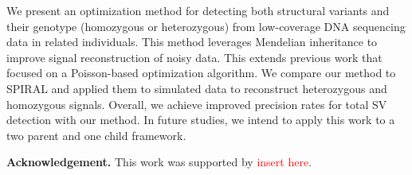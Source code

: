 We present an optimization method for detecting both structural variants and their genotype (homozygous or heterozygous) from low-coverage DNA sequencing data in related individuals. This method leverages Mendelian inheritance to improve signal reconstruction of noisy data. This extends previous work that focused on a Poisson-based optimization algorithm. We compare our method to SPIRAL and applied them to simulated data to reconstruct heterozygous and homozygous signals. Overall, we achieve improved precision rates for total SV detection with our method.
In future studies, we intend to apply this work to a two parent and one child framework. 

\textbf{Acknowledgement.} This work was supported by \textcolor{red}{insert here}.

